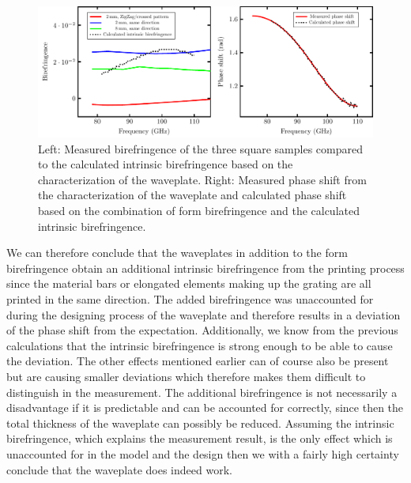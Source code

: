 \begin{figure}[H]
    \centering
    \includegraphics[scale=.7]{images/results/plots/polymer/IntrinsicBF/FullPlatesWcalc.pdf}
    \caption{Left: Measured birefringence of the three square samples compared to the calculated intrinsic birefringence based on the characterization of the waveplate. Right: Measured phase shift from the characterization of the waveplate and calculated phase shift based on the combination of form birefringence and the calculated intrinsic birefringence.}
    \label{fig:FullPlatesWcalc}
\end{figure}

We can therefore conclude that the waveplates in addition to the form birefringence obtain an additional intrinsic birefringence from the printing process since the material bars or elongated elements making up the grating are all printed in the same direction. The added birefringence was unaccounted for during the designing process of the waveplate and therefore results in a deviation of the phase shift from the expectation. Additionally, we know from the previous calculations that the intrinsic birefringence is strong enough to be able to cause the deviation. The other effects mentioned earlier can of course also be present but are causing smaller deviations which therefore makes them difficult to distinguish in the measurement. The additional birefringence is not necessarily a disadvantage if it is predictable and can be accounted for correctly, since then the total thickness of the waveplate can possibly be reduced. Assuming the intrinsic birefringence, which explains the measurement result, is the only effect which is unaccounted for in the model and the design then we with a fairly high certainty conclude that the waveplate does indeed work. 
